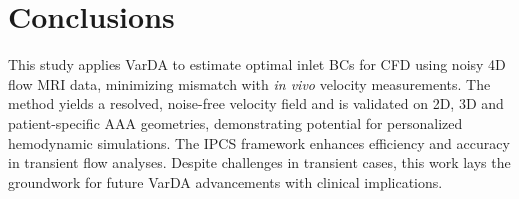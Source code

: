 \section*{Conclusions}
This study applies VarDA to estimate optimal inlet BCs for CFD using noisy 4D flow MRI data, minimizing mismatch with \textit{in vivo} velocity measurements.
The method yields a resolved, noise-free velocity field and is validated on 2D, 3D and patient-specific AAA geometries, demonstrating potential for personalized hemodynamic simulations.
The IPCS framework enhances efficiency and accuracy in transient flow analyses. Despite challenges in transient cases, this work lays the groundwork for future VarDA advancements with clinical implications.






